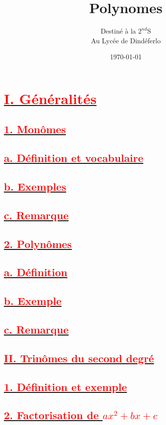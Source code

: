 \documentclass[12pt]{article}
\author{Destiné à la $2^{nd}$S\\Au Lycée de Dindéferlo}
\title{\textbf{Polynomes}}
\date{\today}
\begin{document}
\maketitle
\newpage

\section*{\underline{\textcolor{red}{\textbf{I. Généralités }}}}

\subsection*{\underline{\textcolor{red}{\textbf{1. Monômes}}}}

\subsection*{\underline{\textcolor{red}{\textbf{a. Définition et vocabulaire}}}}

\subsection*{\underline{\textcolor{red}{\textbf{b. Exemples}}}}

\subsection*{\underline{\textcolor{red}{\textbf{c. Remarque}}}}

\subsection*{\underline{\textcolor{red}{\textbf{2. Polynômes}}}}

\subsection*{\underline{\textcolor{red}{\textbf{a. Définition}}}}

\subsection*{\underline{\textcolor{red}{\textbf{b. Exemple}}}}

\subsection*{\underline{\textcolor{red}{\textbf{c. Remarque}}}}

\subsection*{\underline{\textcolor{red}{\textbf{II. Trinômes du second degré}}}}

\subsection*{\underline{\textcolor{red}{\textbf{1. Définition et exemple}}}}

\subsection*{\underline{\textcolor{red}{\textbf{2. Factorisation de $ax^{2}+bx+c$}}}}
\end{document}
